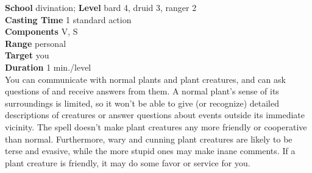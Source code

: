 \textbf{School} divination; \textbf{Level} bard 4, druid 3, ranger 2\\
\textbf{Casting Time} 1 standard action\\
\textbf{Components} V, S\\
\textbf{Range} personal\\
\textbf{Target} you\\
\textbf{Duration} 1 min./level\\
You can communicate with normal plants and plant creatures, and can ask questions of and receive answers from them. A normal plant's sense of its surroundings is limited, so it won't be able to give (or recognize) detailed descriptions of creatures or answer questions about events outside its immediate vicinity. The spell doesn't make plant creatures any more friendly or cooperative than normal. Furthermore, wary and cunning plant creatures are likely to be terse and evasive, while the more stupid ones may make inane comments. If a plant creature is friendly, it may do some favor or service for you.\\
